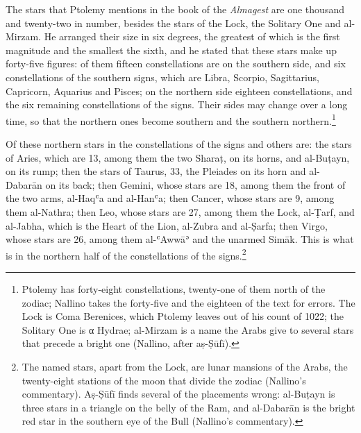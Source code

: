 \documentclass[11pt]{article}
\newcommand{\ArPage}[1]{\marginpar{\footnotesize\color{gray}Ar.\,p.\,#1}}
\begin{document}
\par The stars that Ptolemy mentions in the book of the \emph{Almagest} are one thousand and twenty-two in number, besides the stars of the Lock, the Solitary One and al-Mirzam. He arranged their size in six degrees, the greatest of which is the first magnitude and the smallest the sixth, and he stated that these stars make up forty-five figures: of them fifteen constellations are on the southern side, and six constellations of the southern signs, which are Libra, Scorpio, Sagittarius, Capricorn, Aquarius and Pisces; on the northern side eighteen constellations, and the six remaining constellations of the signs. Their sides may change over a long time, so that the northern ones become southern and the southern northern.\footnote{Ptolemy has forty-eight constellations, twenty-one of them north of the zodiac; Nallino takes the forty-five and the eighteen of the text for errors. The Lock is Coma Berenices, which Ptolemy leaves out of his count of 1022; the Solitary One is α Hydrae; al-Mirzam is a name the Arabs give to several stars that precede a bright one (Nallino, after aṣ-Ṣūfī).}\par
\par \ArPage{189}Of these northern stars in the constellations of the signs and others are: the stars of Aries, which are 13, among them the two Sharaṭ, on its horns, and al-Buṭayn, on its rump; then the stars of Taurus, 33, the Pleiades on its horn and al-Dabarān on its back; then Gemini, whose stars are 18, among them the front of the two arms, al-Haqʿa and al-Hanʿa; then Cancer, whose stars are 9, among them al-Nathra; then Leo, whose stars are 27, among them the Lock, al-Ṭarf, and al-Jabha, which is the Heart of the Lion, al-Zubra and al-Ṣarfa; then Virgo, whose stars are 26, among them al-ʿAwwāʾ and the unarmed Simāk. This is what is in the northern half of the constellations of the signs.\footnote{The named stars, apart from the Lock, are lunar mansions of the Arabs, the twenty-eight stations of the moon that divide the zodiac (Nallino's commentary). Aṣ-Ṣūfī finds several of the placements wrong: al-Buṭayn is three stars in a triangle on the belly of the Ram, and al-Dabarān is the bright red star in the southern eye of the Bull (Nallino's commentary).}\par
\end{document}
